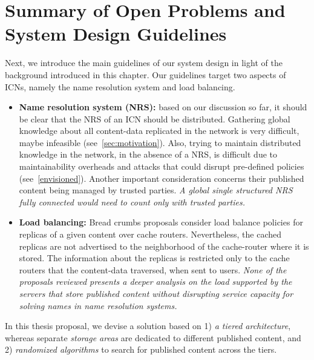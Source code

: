 \section{Summary of Open Problems and System Design Guidelines}

\label{sec:summaryopendesign}


Next, we introduce the main guidelines of our system design in light of the background introduced in this chapter.
  Our guidelines target two aspects of ICNs, namely the name resolution system and load balancing.

\begin{itemize}
\item \textbf{Name resolution system (NRS): }  
based on our discussion so far, it should be clear that the NRS  of an ICN 
should be distributed.  Gathering global knowledge about all content-data replicated in the network is 
very difficult, maybe infeasible (see~\textsection\ref{sec:motivation}).  
Also, trying to maintain distributed knowledge in the network, 
in the absence of a NRS, is difficult due to maintainability overheads  
and attacks that could disrupt pre-defined policies (see~\textsection\ref{envisioned}). Another important consideration concerns their
 published content being managed by trusted parties. \emph{A global single structured NRS fully 
connected would need to count only with trusted parties.  }
\item \textbf{Load balancing: }  
Bread crumbs proposals consider load balance policies for replicas of a given 
content over cache routers. 
Nevertheless, the cached replicas are not advertised to the neighborhood of the cache-router where it is stored.
  The information about the replicas is restricted only to the cache routers that the content-data traversed, when sent to users.
\emph{None of the proposals reviewed presents a deeper analysis on the load supported 
by the servers that store published content without disrupting service capacity for solving names 
in name resolution systems. }
\end{itemize}



In this thesis proposal, we devise a solution based on 1) \emph{a tiered architecture}, whereas
 separate \emph{storage areas} are dedicated to different published content, and 2) 
\emph{randomized algorithms} to search for published content across the tiers. 

